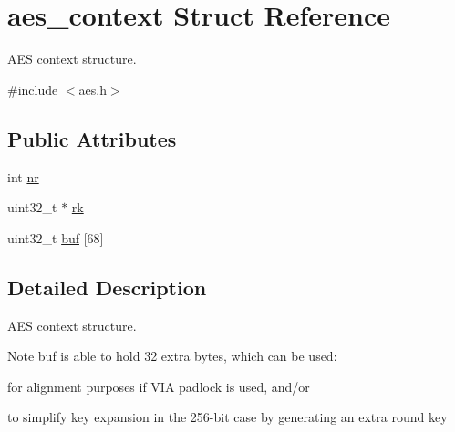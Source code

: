 \hypertarget{structaes__context}{
\section{aes\_\-context Struct Reference}
\label{structaes__context}
}


AES context structure.  


{\ttfamily \#include $<$aes.h$>$}\subsection*{Public Attributes}
\begin{DoxyCompactItemize}
\item 
int \hyperlink{structaes__context_af05054b9a37a06446ef0abf43cd97520}{nr}
\item 
uint32\_\-t $\ast$ \hyperlink{structaes__context_a93db0195022595f748c001221cc31abe}{rk}
\item 
uint32\_\-t \hyperlink{structaes__context_a5b40a8d4bfd83ebbfff914cd8f561afa}{buf} \mbox{[}68\mbox{]}
\end{DoxyCompactItemize}


\subsection{Detailed Description}
AES context structure. \begin{DoxyNote}{Note}
buf is able to hold 32 extra bytes, which can be used:
\begin{DoxyItemize}
\item for alignment purposes if VIA padlock is used, and/or
\item to simplify key expansion in the 256-\/bit case by generating an extra round key 
\end{DoxyItemize}
\end{DoxyNote}


